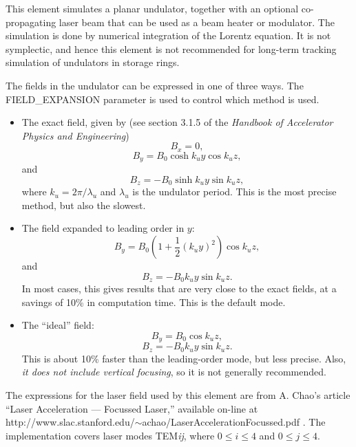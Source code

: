 This element simulates a planar undulator, together with an optional
co-propagating laser beam that can be used as a beam heater or
modulator.  The simulation is done by numerical integration of the
Lorentz equation.  It is not symplectic, and hence this element is not
recommended for long-term tracking simulation of undulators in storage
rings.  

The fields in the undulator can be expressed in one of three ways.
The FIELD\_EXPANSION parameter is used to control which method is used.
\begin{itemize}
\item The exact field, given by (see section 3.1.5 of the {\em Handbook of
Accelerator Physics and Engineering})
\begin{equation}
B_x = 0,
\end{equation}
\begin{equation}
B_y = B_0 \cosh k_u y \cos k_u z,
\end{equation}
and
\begin{equation}
B_z = -B_0 \sinh k_u y \sin k_u z ,
\end{equation}
where $k_u = 2\pi/\lambda_u$ and $\lambda_u$ is the undulator period.
This is the most precise method, but also the slowest.  

\item The field expanded to leading order in $y$:
\begin{equation}
B_y = B_0 ( 1 + \frac{1}{2}(k_u y)^2 ) \cos k_u z,
\end{equation}
and
\begin{equation}
B_z = -B_0 k_u y \sin k_u z.
\end{equation}
In most cases, this gives results that are very close to the exact fields,
at a savings of 10\% in computation time.
This is the default mode.

\item The ``ideal'' field:
\begin{equation}
B_y = B_0 \cos k_u z,
\end{equation}
\begin{equation}
B_z = -B_0 k_u y \sin k_u z.
\end{equation}
This is about 10\% faster than the leading-order mode, but less
precise.  Also, {\em it does not include vertical focusing}, so it is
not generally recommended.
\end{itemize}

The expressions for the laser field used by this element are from
A. Chao's article ``Laser Acceleration --- Focussed Laser,'' available
on-line at \\
http://www.slac.stanford.edu/$\sim$achao/LaserAccelerationFocussed.pdf .
The implementation covers laser modes TEM{\em ij}, where
$0\leq i \leq 4$ and $0 \leq j \leq 4$.

